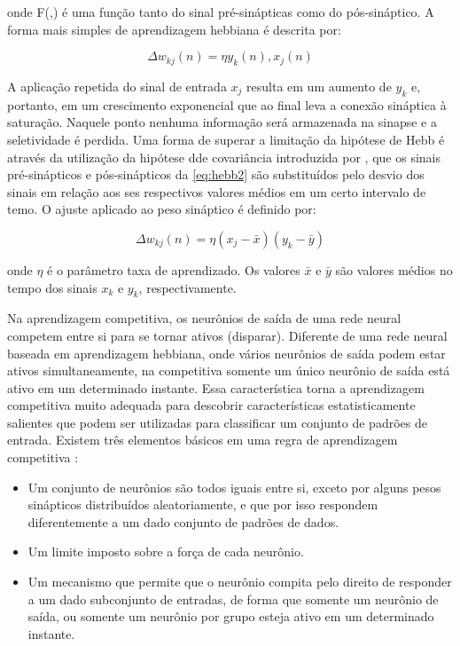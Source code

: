 onde F(,) é uma função tanto do sinal pré-sinápticas como do pós-sináptico. A forma mais simples de aprendizagem hebbiana é descrita por:

\begin{equation} \label{eq:hebb2}
    \Delta w_{kj}(n) = \eta y_{k}(n), x_{j}(n)
\end{equation}

A aplicação repetida do sinal de entrada $x_{j}$ resulta em um aumento de $y_{k}$ e, portanto, em um crescimento exponencial que ao final leva a conexão sináptica à saturação. Naquele ponto nenhuma informação será armazenada na sinapse e a seletividade é perdida. Uma forma de superar a limitação da hipótese de Hebb é através da utilização da hipótese dde covariância introduzida por , que os sinais pré-sinápticos e pós-sinápticos da \autoref{eq:hebb2} são substituídos pelo desvio dos sinais em relação aos ses respectivos valores médios em um certo intervalo de temo. O ajuste aplicado ao peso sináptico é definido por:

\begin{equation} \label{eq:hebb2}
    \Delta w_{kj}(n) = \eta(x_{j} - \bar{x})(y_{k} - \bar{y})
\end{equation}

onde $\eta$ é o parâmetro taxa de aprendizado. Os valores $\bar{x}$ e $\bar{y}$ são valores médios no tempo dos sinais $x_{k}$ e $y_{k}$, respectivamente.

Na aprendizagem competitiva, os neurônios de saída de uma rede neural competem entre si para se tornar ativos (disparar). Diferente de uma rede neural baseada em aprendizagem hebbiana, onde vários neurônios de saída podem estar ativos simultaneamente, na competitiva somente um único neurônio de saída está ativo em um determinado instante. Essa característica torna a aprendizagem competitiva muito adequada para descobrir características estatisticamente salientes que podem ser utilizadas para classificar um conjunto de padrões de entrada. Existem três elementos básicos em uma regra de aprendizagem competitiva \cite{rumelhart1985feature}:
    \begin{itemize}
        \item Um conjunto de neurônios são todos iguais entre si, exceto por alguns pesos sinápticos distribuídos aleatoriamente, e que por isso respondem diferentemente a um dado conjunto de padrões de dados.
        \item Um limite imposto sobre a força de cada neurônio.
        \item Um mecanismo que permite que o neurônio compita pelo direito de responder a um dado subconjunto de entradas, de forma que somente um neurônio de saída, ou somente um neurônio por grupo esteja ativo em um determinado instante.
    \end{itemize}
    

